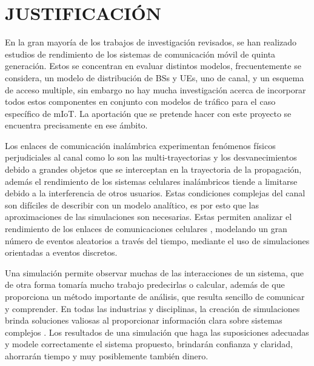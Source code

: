 
\section{JUSTIFICACIÓN}

En la gran mayoría de los trabajos de investigación revisados, se han realizado estudios de rendimiento de los sistemas de comunicación móvil de quinta generación. Estos se concentran en evaluar distintos modelos, frecuentemente se considera, un modelo de distribución de BSs y UEs, uno de canal, y un esquema de acceso multiple, sin embargo no hay mucha investigación acerca de incorporar todos estos componentes en conjunto con modelos de tráfico para el caso específico de mIoT. La aportación que se pretende hacer con este proyecto se encuentra precisamente en ese ámbito.\newline

Los enlaces de comunicación inalámbrica experimentan fenómenos físicos perjudiciales al canal como lo son las multi-trayectorias y los desvanecimientos debido a grandes objetos que se interceptan en la trayectoria de la propagación, además el rendimiento de los sistemas celulares inalámbricos tiende a limitarse debido a la interferencia de otros usuarios. Estas condiciones complejas del canal son difíciles de describir con un modelo analítico, es por esto que las aproximaciones de las simulaciones son necesarias. Estas permiten analizar el rendimiento de los enlaces de comunicaciones celulares \parencite{WirelessSim}, modelando un gran número de eventos aleatorios a través del tiempo, mediante el uso de simulaciones orientadas a eventos discretos. \newline

Una simulación permite observar muchas de las interacciones de un sistema, que de otra forma tomaría mucho trabajo predecirlas o calcular, además de que proporciona un método importante de análisis, que resulta sencillo de comunicar y comprender. En todas las industrias y disciplinas, la creación de simulaciones brinda soluciones valiosas al proporcionar información clara sobre sistemas complejos \parencite{WirelessSim}. Los resultados de una simulación que haga las suposiciones adecuadas y modele correctamente el sistema propuesto, brindarán confianza y claridad, ahorrarán tiempo y muy posiblemente también dinero.\newline

